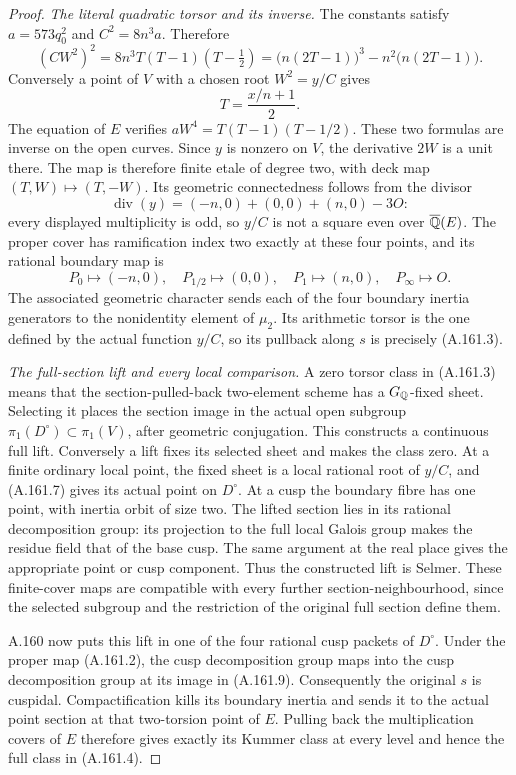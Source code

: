 \begin{proof}
\emph{The literal quadratic torsor and its inverse.}
The constants satisfy \(a=573q_0^2\) and
\(C^2=8n^3a\).  Therefore
\[
 (CW^2)^2=8n^3T(T-1)(T-\tfrac12)
            =\bigl(n(2T-1)\bigr)^3-n^2\bigl(n(2T-1)\bigr).
\tag{A.161.6}
\]
Conversely a point of \(V\) with a chosen root
\(W^2=y/C\) gives
\[
                            T=\frac{x/n+1}{2}.
\tag{A.161.7}
\]
The equation of \(E\) verifies
\(aW^4=T(T-1)(T-1/2)\).  These two formulas are inverse
on the open curves.  Since \(y\) is nonzero on \(V\),
the derivative \(2W\) is a unit there.  The map is
therefore finite etale of degree two, with deck map
\((T,W)\mapsto(T,-W)\).
Its geometric connectedness follows from the divisor
\[
                \operatorname{div}(y)
                   =(-n,0)+(0,0)+(n,0)-3O:
\tag{A.161.8}
\]
every displayed multiplicity is odd, so \(y/C\) is
not a square even over \(\overline{\mathbb Q}(E)\).
The proper cover has ramification index two exactly
at these four points, and its rational boundary map is
\[
 P_0\mapsto(-n,0),\quad P_{1/2}\mapsto(0,0),\quad
 P_1\mapsto(n,0),\quad P_\infty\mapsto O.
\tag{A.161.9}
\]
The associated geometric character sends each of the
four boundary inertia generators to the nonidentity
element of \(\mu_2\).  Its arithmetic torsor is the
one defined by the actual function \(y/C\), so its
pullback along \(s\) is precisely (A.161.3).

\emph{The full-section lift and every local comparison.}
A zero torsor class in (A.161.3) means that the
section-pulled-back two-element scheme has a
\(G_\mathbb Q\)-fixed sheet.  Selecting it places the
section image in the actual open subgroup
\(\pi_1(D^\circ)\subset\pi_1(V)\), after geometric
conjugation.  This constructs a continuous full lift.
Conversely a lift fixes its selected sheet and makes
the class zero.  At a finite ordinary local point,
the fixed sheet is a local rational root of \(y/C\),
and (A.161.7) gives its actual point on \(D^\circ\).
At a cusp the boundary fibre has one point, with
inertia orbit of size two.  The lifted section lies
in its rational decomposition group: its projection
to the full local Galois group makes the residue
field that of the base cusp.  The same argument at
the real place gives the appropriate point or cusp
component.  Thus the constructed lift is Selmer.
These finite-cover maps are compatible with every
further section-neighbourhood, since the selected
subgroup and the restriction of the original full
section define them.

A.160 now puts this lift in one of the four rational
cusp packets of \(D^\circ\).  Under the proper map
(A.161.2), the cusp decomposition group maps into
the cusp decomposition group at its image in
(A.161.9).  Consequently the original \(s\) is
cuspidal.  Compactification kills its boundary
inertia and sends it to the actual point section
at that two-torsion point of \(E\).  Pulling back
the multiplication covers of \(E\) therefore gives
exactly its Kummer class at every level and hence
the full class in (A.161.4).


\end{proof}
